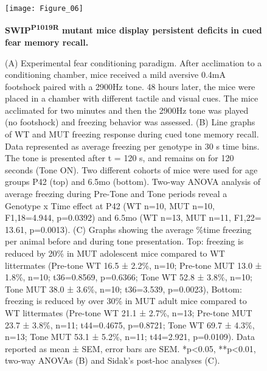 \begin{figure}[!ht]
	\begin{fullwidth}
	\begin{center}
	\captionsetup{labelformat=empty}
	\texttt{[image: Figure\_06]}
	\caption{\textbf{SWIP\textsuperscript{P1019R} mutant mice display persistent deficits 
		in cued fear memory recall.}}
	\end{center}
	\end{fullwidth}
\end{figure}

\begin{figure}[!ht]
	\begin{fullwidth}
	\begin{center}
	\captionsetup{labelformat=adja-page}
	\ContinuedFloat
	\caption{
		(A) Experimental fear conditioning paradigm. After acclimation to a conditioning
		chamber, mice received a mild aversive 0.4mA footshock paired with a 2900Hz
		tone. 48 hours later, the mice were placed in a chamber with different tactile
		and visual cues. The mice acclimated for two minutes and then the 2900Hz tone
		was played (no footshock) and freezing behavior was assessed. 
		(B) Line graphs of WT and MUT freezing response during cued tone memory recall.
		Data represented as average freezing per genotype in 30 s time bins. The tone is
		presented after t = 120 s, and remains on for 120 seconds (Tone ON). Two
		different cohorts of mice were used for age groups P42 (top) and 6.5mo (bottom).
		Two-way ANOVA analysis of average freezing during Pre-Tone and Tone periods
		reveal a Genotype x Time effect at P42 (WT n=10, MUT n=10, F1,18=4.944,
		p=0.0392) and 6.5mo (WT n=13, MUT n=11, F1,22= 13.61, p=0.0013). 
		(C) Graphs showing the average \%time freezing per animal before and during tone
		presentation. Top: freezing is reduced by 20\% in MUT adolescent mice compared to
		WT littermates (Pre-tone WT 16.5 ± 2.2\%, n=10; Pre-tone MUT 13.0 ± 1.8\%, n=10;
		t36=0.8569, p=0.6366; Tone WT 52.8 ± 3.8\%, n=10; Tone MUT 38.0 ± 3.6\%, n=10;
		t36=3.539, p=0.0023), Bottom: freezing is reduced by over 30\% in MUT adult mice
		compared to WT littermates (Pre-tone WT 21.1 ± 2.7\%, n=13; Pre-tone MUT 23.7 ±
		3.8\%, n=11; t44=0.4675, p=0.8721; Tone WT 69.7 ± 4.3\%, n=13; Tone MUT 53.1 ±
		5.2\%, n=11; t44=2.921, p=0.0109). Data reported as mean ± SEM, error bars are
		SEM. *p<0.05, **p<0.01, two-way ANOVAs (B) and Sidak’s post-hoc analyses (C).
	}
	\label{fig:fig6}
	\end{center}
	\end{fullwidth}
\end{figure}


